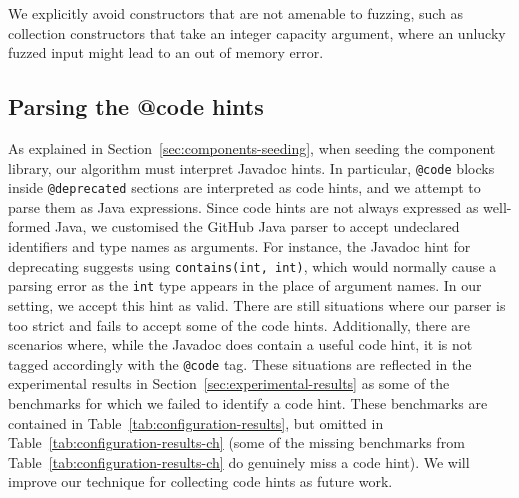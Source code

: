\documentclass[10pt,conference]{IEEEtran}
\begin{document}
We explicitly avoid constructors that are not amenable to fuzzing, such as
collection constructors that take an integer capacity argument, where an
unlucky fuzzed input might lead to an out of memory error.

\subsection{Parsing the @code hints} \label{sec:parse}

As explained in Section~\ref{sec:components-seeding}, when seeding the component library, our algorithm must
interpret Javadoc hints. %
In particular, \texttt{@code} blocks inside \texttt{@deprecated} sections are interpreted as code
hints, and we attempt to parse them as Java expressions. Since code hints are
not always expressed as well-formed Java, we customised the
GitHub Java parser
to accept undeclared identifiers and type names
as arguments. For instance, the Javadoc hint for deprecating 
suggests using 
\texttt{contains(int, int)}, which would normally cause a parsing error as the \texttt{int} type
appears in the place of argument names. In our setting, we accept this hint as valid.
There are still situations where our parser is too strict and fails to accept
some of the code hints. Additionally, there are scenarios where, while the Javadoc
does contain a useful code hint, it is not tagged accordingly with
the \texttt{@code} tag. These situations are reflected in the experimental results
in Section~\ref{sec:experimental-results}
as some of the benchmarks for which we failed to identify a code hint. These benchmarks
are contained in Table~\ref{tab:configuration-results}, but omitted in Table~\ref{tab:configuration-results-ch} (some of the missing benchmarks from Table~\ref{tab:configuration-results-ch} do genuinely miss a code hint). We will improve our technique for collecting code hints as future work.
 
\end{document}
